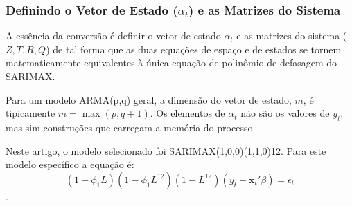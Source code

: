 \documentclass[ 12pt,a4paper ]{article} %
\begin{document}
	\subsubsection{Definindo o Vetor de Estado ($\alpha_t$) e as Matrizes do Sistema}
	
	A essência da conversão é definir o vetor de estado $\alpha_t$ e as matrizes do sistema ($Z, T, R, Q$) de tal forma que as duas equações de espaço e de estados se tornem matematicamente equivalentes à única equação de polinômio de defasagem do SARIMAX.
	
	Para um modelo ARMA(p,q) geral, a dimensão do vetor de estado, $m$, é tipicamente $m = \max(p, q+1)$. Os elementos de $\alpha_t$ não são os valores de $y_t$, mas sim construções que carregam a memória do processo.
	
	Neste artigo, o modelo selecionado foi SARIMAX(1,0,0)(1,1,0)12. Para este modelo específico a equação é: $$(1 - \phi_1 L)(1 - \tilde{\phi}_1 L^{12})(1 - L^{12})(y_t - \mathbf{x}_t'\beta) = \epsilon_t$$.
	
\end{document}
